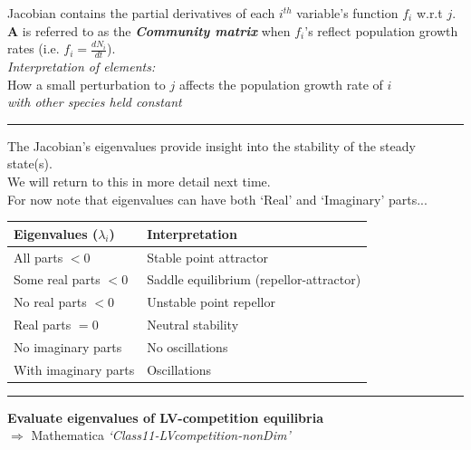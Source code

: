 \documentclass{article}
\newcommand{\note}[1]{\colorbox{gray!30}{#1}}
\newcommand{\ind}{\-\hspace{1cm}}
\begin{document}
Jacobian contains the partial derivatives of each $i^{th}$ variable's function $f_i$ w.r.t $j$.\\

\textbf{A} is referred to as the \emph{\textbf{Community matrix}} when $f_i$'s reflect population growth rates (i.e. $f_i=\tfrac{dN_i}{dt}$).\\

\emph{Interpretation of elements:}\\
\ind How a small perturbation to $j$ affects the population growth rate of $i$\\
\ind \ind \ind \ind \ind \ind  \ind \ind \ind \emph{with other species held constant}\\

\rule[0.5ex]{\linewidth}{1pt}

\pagebreak

The Jacobian's eigenvalues provide insight into the stability of the steady state(s).\\
We will return to this in more detail next time.\\
\ind For now note that eigenvalues can have both `Real' and `Imaginary' parts...

\begin{center}
\begin{tabular}{ll}
\hline
\textbf{Eigenvalues ($\lambda_i$)} & \textbf{Interpretation} \\ 
\hline
 All parts $< 0$ & Stable point attractor \\ 
 Some real parts $< 0$ & Saddle equilibrium (repellor-attractor) \\ 
 No real parts $<0$ & Unstable point repellor  \\ 
 Real parts $=0$ & Neutral stability \\ 
 \hline
 No imaginary parts & No oscillations \\ 
 With imaginary parts & Oscillations \\ 
 \hline
\end{tabular} 
\end{center}

\rule[0.5ex]{\linewidth}{1pt}

\textbf{Evaluate eigenvalues of LV-competition equilibria}\\
\ind \note{$\Rightarrow$ Mathematica \emph{`Class11-LVcompetition-nonDim'}}\\
\end{document}
